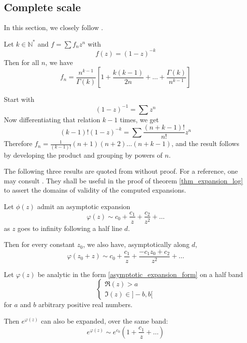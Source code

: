 \documentclass[../main.tex]{subfiles}
\begin{document}
\subsection{Complete scale}

In this section, we closely follow \cite{Jungen1931}.

\begin{lemma}{}
	Let $k \in \mathbb{N}^*$ and $f = \sum f_n z^n$ with
	$$
	f(z) = {(1 - z)}^{-k}
	$$
	Then for all $n$, we have
	$$
	f_n = \frac{n^{k - 1}}{\Gamma(k)} \left[1 + \frac{k(k-1)}{2n} + \dots + \frac{\Gamma(k)}{n^{k-1}}\right]
	$$
	
	\tcblower

	Start with
	$${(1 - z)}^{-1} = \sum z^n$$
	Now differentiating that relation $k - 1$ times, we get
	$$
	(k-1)! {(1-z)}^{-k} = \sum \frac{(n + k -1)!}{n!}z^n
	$$
	Therefore $f_n = \frac{1}{(k-1)!} (n+1)(n+2)\dots(n+k-1)$, and the result follows by developing the product and grouping by powers of $n$.
\end{lemma}

The following three results are quoted from \cite{Jungen1931} without proof. For a reference, one may consult \cite{knopp1928}. They shall be useful in the proof of theorem \ref{thm_expansion_log} to assert the domains of validity of the computed expansions.

\begin{lemma}{}\label{jungen_lemma_1}
	Let $\phi(z)$ admit an asymptotic expansion
	\begin{equation}\label{asymptotic_expansion_form}
	\varphi(z) \sim c_0 + \frac{c_1}{z} + \frac{c_2}{z^2} + \dots
	\end{equation}
	as $z$ goes to infinity following a half line $d$.
	
	Then for every constant $z_0$, we also have, asymptotically along $d$,
	\[
	\varphi(z_0 + z) \sim c_0 + \frac{c_1}{z} + \frac{-c_1 z_0 + c_2}{z^2} + \dots
	\]
\end{lemma}

\begin{lemma}{}\label{jungen_lemma_2}
	Let $\varphi(z)$ be analytic in the form \eqref{asymptotic_expansion_form} on a half band
	\begin{equation}\label{band_form}
	\begin{cases}
		\Re(z) > a\\
		\Im(z) \in ]-b, b[
	\end{cases}
	\end{equation}
	for $a$ and $b$ arbitrary positive real numbers.
	
	Then $e^{\varphi(z)}$ can also be expanded, over the same band:
	\[
	e^{\varphi(z)} \sim e^{c_0} \left(1 + \frac{c_1}{z} + \dots\right)
	\]
\end{lemma}
\end{document}
